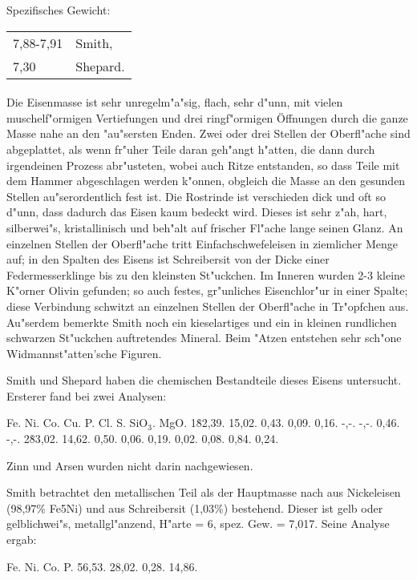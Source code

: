 \documentclass[a4paper, 11pt, oneside]{article}
\begin{document}
Spezifisches Gewicht:  
\begin{table}[!ht]
    \centering
    \begin{tabular}{l l}
        7,88-7,91 & Smith,\\
        7,30 & Shepard.
    \end{tabular}
\end{table}
\paragraph{}
Die Eisenmasse ist sehr unregelm"a"sig, flach, sehr d"unn, mit vielen muschelf"ormigen Vertiefungen und drei ringf"ormigen Öffnungen durch die ganze Masse nahe an den "au"sersten Enden. Zwei oder drei Stellen der Oberfl"ache sind abgeplattet, als wenn fr"uher Teile daran geh"angt h"atten, die dann durch irgendeinen Prozess abr"usteten, wobei auch Ritze entstanden, so dass Teile mit dem Hammer abgeschlagen werden k"onnen, obgleich die Masse an den gesunden Stellen au"serordentlich fest ist. Die Rostrinde ist verschieden dick und oft so d"unn, dass dadurch das Eisen kaum bedeckt wird. Dieses ist sehr z"ah, hart, silberwei"s, kristallinisch und beh"alt auf frischer Fl"ache lange seinen Glanz. An einzelnen Stellen der Oberfl"ache tritt Einfachschwefeleisen in ziemlicher Menge auf; in den Spalten des Eisens ist Schreibersit von der Dicke einer Federmesserklinge bis zu den kleinsten St"uckchen. Im Inneren wurden 2-3 kleine K"orner Olivin gefunden; so auch festes, gr"unliches Eisenchlor"ur in einer Spalte; diese Verbindung schwitzt an einzelnen Stellen der Oberfl"ache in Tr"opfchen aus. Au"serdem bemerkte Smith noch ein kieselartiges und ein in kleinen rundlichen schwarzen St"uckchen auftretendes Mineral. Beim "Atzen entstehen sehr sch"one Widmannst"atten'sche Figuren.

Smith und Shepard haben die chemischen Bestandteile dieses Eisens untersucht. Ersterer fand bei zwei Analysen:

Fe. Ni. Co. Cu. P. Cl. S. SiO$_{3}$. MgO.  
1\. 82,39. 15,02. 0,43. 0,09. 0,16. -,-. -,-. 0,46. -,-.  
2\. 83,02. 14,62. 0,50. 0,06. 0,19. 0,02. 0,08. 0,84. 0,24.

Zinn und Arsen wurden nicht darin nachgewiesen.

Smith betrachtet den metallischen Teil als der Hauptmasse nach aus Nickeleisen (98,97\% Fe5Ni) und aus Schreibersit (1,03\%) bestehend. Dieser ist gelb oder gelblichwei"s, metallgl"anzend, H"arte = 6, spez. Gew. = 7,017. Seine Analyse ergab:

Fe. Ni. Co. P.  
56,53. 28,02. 0,28. 14,86.
\end{document}

